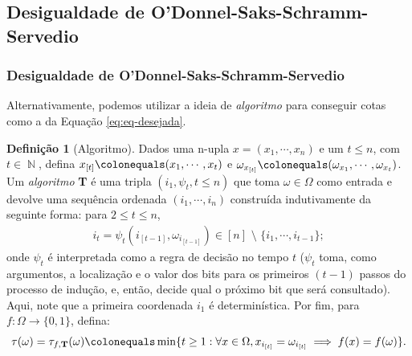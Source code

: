\documentclass[9pt]{beamer}
\theoremstyle{definition} %
\newtheorem{mydef}{Definição}
\DeclareMathOperator{\NX}{\mathbb{N}} %
\begin{document}
	\subsection{Desigualdade de O'Donnel-Saks-Schramm-Servedio}
	\begin{frame}[t]
		\frametitle{Desigualdade de O'Donnel-Saks-Schramm-Servedio}
		Alternativamente, podemos utilizar a ideia de \textit{algoritmo} para conseguir cotas como a da Equação \ref{eq:eq-desejada}.
		\begin{mydef}[Algoritmo]
				Dados uma n-upla $x = (x_1, \cdots, x_n)$ e um $t \leq n$, com $t \in \NX$, defina $x_{[t]} \colonequals (x_1, \cdots, x_t)$ e $\omega_{x_{[t]}} \colonequals (\omega_{x_1}, \cdots, \omega_{x_t})$. Um \textit{algoritmo} \textbf{T} é uma tripla $(i_1, \psi_t, t \leq n)$ que toma $\omega \in \Omega$ como entrada e devolve uma sequência ordenada $(i_1, \cdots, i_n)$ construída indutivamente da seguinte forma: para $2 \leq t \leq n$,
				\begin{align*}
					i_t = \psi_t(i_{[t-1]}, \omega_{i_{[t-1]}}) \in [n] \text{~\textbackslash~} \{i_1, \cdots, i_{t-1}\};
				\end{align*}
				onde $\psi_t$ é interpretada como a regra de decisão no tempo $t$ ($\psi_t$ toma, como argumentos, a localização e o valor dos bits para os primeiros $(t-1)$ passos do processo de indução, e, então, decide qual o próximo bit que será consultado). Aqui, note que a primeira coordenada $i_1$ é determinística. Por fim, para $f:\Omega \to \{0,1\}$, defina:
				\begin{align*}
					\tau(\omega) = \tau_{f, \text{\textbf{T}}}(\omega) \colonequals \min\{t \geq 1: \forall x \in \Omega, x_{i_{[t]}} = \omega_{i_{[t]}} \implies f(x) = f(\omega)\}.
				\end{align*}
		\end{mydef}
	\end{frame}
\end{document}
